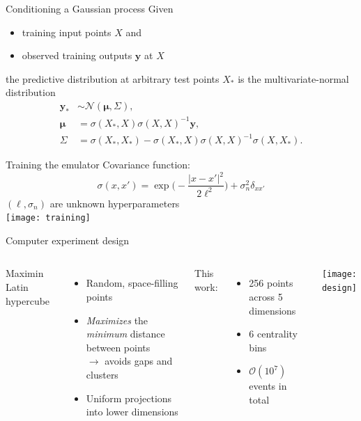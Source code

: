 \documentclass{beamer}
\newcommand{\order}[1]{$\mathcal O(10^{#1})$}
\newcommand{\y}{\mathbf y}
\begin{document}
\begin{frame}{Conditioning a Gaussian process}
  Given
  \begin{itemize}
    \item training input points $X$ and
    \item observed training outputs $\y$ at $X$
  \end{itemize}
  the predictive distribution at arbitrary test points $X_*$ is the multivariate-normal distribution
  \begin{align*}
    \y_* &\sim \mathcal N(\boldsymbol\mu, \Sigma), \\
    \boldsymbol\mu &= \sigma(X_*, X)\sigma(X, X)^{-1}\y, \\
    \Sigma &= \sigma(X_*,X_*) - \sigma(X_*,X)\sigma(X,X)^{-1}\sigma(X,X_*).
  \end{align*}
\end{frame}

\begin{frame}{Training the emulator}
  Covariance function:
  \begin{equation*}
    \sigma(x, x') = \exp\biggl( -\frac{|x - x'|^2}{2\ell^2} \biggr) +
                    \sigma_n^2\delta_{xx'}
  \end{equation*}
  $(\ell, \sigma_n)$ are unknown hyperparameters \\
  \bigskip
  \centering
  \texttt{[image: training]}
\end{frame}


\begin{frame}{Computer experiment design}
  \begin{columns}
    Maximin Latin hypercube
    \begin{itemize}
      \item Random, space-filling points
      \item \emph{Maximizes} the \emph{minimum} distance between points \\
        $\rightarrow$ avoids gaps and clusters
      \item Uniform projections into lower dimensions
    \end{itemize}
    \smallskip
    This work:
    \begin{itemize}
      \item 256 points across 5 dimensions
      \item 6 centrality bins
      \item \order 7 events in total
    \end{itemize}

    \texttt{[image: design]}
  \end{columns}
\end{frame}
\end{document}
